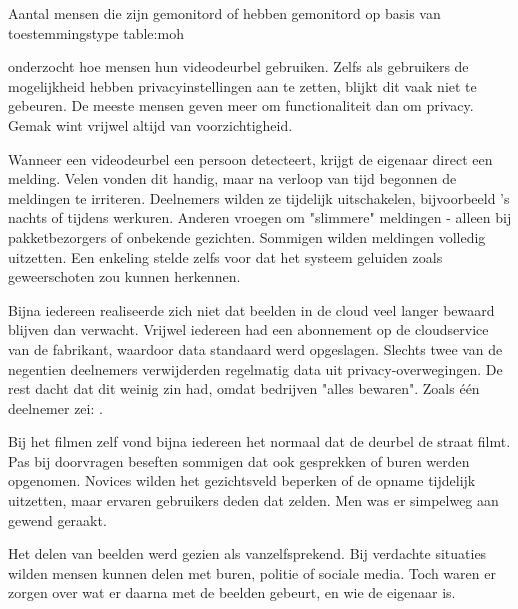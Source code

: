 \documentclass[nonacm,sigconf]{acmart}
\begin{document}
    \SimpleTable{}{}
    {
    }
    \SimpleTable
    {Aantal mensen die zijn gemonitord of hebben gemonitord op basis van toestemmingstype \parencite{moh2023characterizing}}
    {table:moh}
    {
    }

    \parencite{tabassum2023exploring} onderzocht hoe mensen hun videodeurbel gebruiken.
    Zelfs als gebruikers de mogelijkheid hebben privacyinstellingen aan te zetten, blijkt dit vaak niet te gebeuren.
    De meeste mensen geven meer om functionaliteit dan om privacy.
    Gemak wint vrijwel altijd van voorzichtigheid.

    Wanneer een videodeurbel een persoon detecteert, krijgt de eigenaar direct een melding.
    Velen vonden dit handig, maar na verloop van tijd begonnen de meldingen te irriteren.
    Deelnemers wilden ze tijdelijk uitschakelen, bijvoorbeeld 's nachts of tijdens werkuren.
    Anderen vroegen om "slimmere" meldingen - alleen bij pakketbezorgers of onbekende gezichten.
    Sommigen wilden meldingen volledig uitzetten.
    Een enkeling stelde zelfs voor dat het systeem geluiden zoals geweerschoten zou kunnen herkennen.

    Bijna iedereen realiseerde zich niet dat beelden in de cloud veel langer bewaard blijven dan verwacht.
    Vrijwel iedereen had een abonnement op de cloudservice van de fabrikant, waardoor data standaard werd opgeslagen.
    Slechts twee van de negentien deelnemers verwijderden regelmatig data uit privacy-overwegingen.
    De rest dacht dat dit weinig zin had, omdat bedrijven "alles bewaren".
    Zoals één deelnemer zei:
    .

    Bij het filmen zelf vond bijna iedereen het normaal dat de deurbel de straat filmt.
    Pas bij doorvragen beseften sommigen dat ook gesprekken of buren werden opgenomen.
    Novices wilden het gezichtsveld beperken of de opname tijdelijk uitzetten, maar ervaren gebruikers deden dat zelden.
    Men was er simpelweg aan gewend geraakt.

    Het delen van beelden werd gezien als vanzelfsprekend.
    Bij verdachte situaties wilden mensen kunnen delen met buren, politie of sociale media.
    Toch waren er zorgen over wat er daarna met de beelden gebeurt, en wie de eigenaar is.
\end{document}
